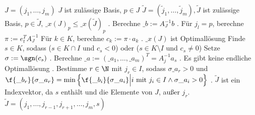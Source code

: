 \documentclass[a4paper]{scrartcl}
\numberwithin{equation}{section}
\begin{document}
\begin{alg}[Simplexschritt]
	\begin{algorithmic}	
		\Input $J=(j_1,\dotsc, j_m)$
		\Assume $J$ ist zulässige Basis, $p\in J$
		\Output $\tilde J = (\tilde j_1,\dotsc,\tilde j_m), \tilde J$ ist zulässige Basis, $p\in \tilde J$, $\_x(J)_p \le \_x(\tilde J)_p$
		\Statex
		.
		\State Berechne $\_b := A_J^{-1} b$
		.
		\State Für $j_l = p$, berechne $\pi := e_t^TA_J^{-1}$
		\State Für $k\in K$, berechne $c_k := \pi\cdot a_k$
		.
			\State $\_x(J)$ ist Optimallösung
		\Else
			\State Finde $s\in K$, sodass ($s\in K\cap I$ und $c_s<0$) oder ($s\in K\setminus I$ und $c_s\neq 0$)
			\State Setze $\sigma := \sgn(c_s)$
			.
			\State Berechne $\_a := (\_a_1, \dotsc, \_a_m)^T = A_j^{-1}a_s$
			.
				\State Es gibt keine endliche Optimallösung
			\Else
				.
				\State Bestimme $r\in \N$ mit $j_r\in I$, sodass $\sigma \_a_r > 0$ und $\f{\_b_r}{\sigma \_a_r} = \min\left\{\f{\_b_i}{\sigma \_a_i} \Big| i \text{ mit } j_i\in I \land \sigma \_a_i > 0\right\}$
				.
				\State $\tilde J$ ist ein Indexvektor, da $s$ enthält und die Elemente von $J$, außer $j_r$.
				\State $\tilde J = (j_1,\dotsc, j_{r-1},j_{r+1},\dotsc,j_m,s)$
			\EndIf
		\EndIf
	\end{algorithmic}
\end{alg}
\setcounter{equation}{12}
\end{document}
